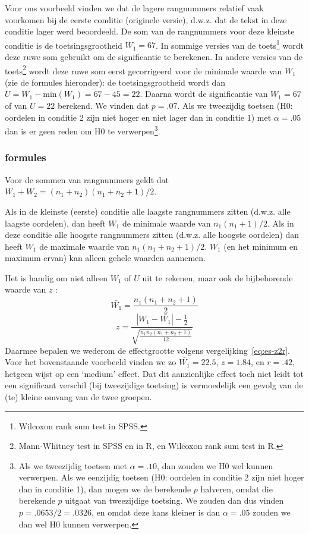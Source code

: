 \documentclass[
]{book}
\begin{document}
Voor ons voorbeeld vinden we dat de lagere rangnummers relatief vaak
voorkomen bij de eerste conditie (originele versie), d.w.z. dat de tekst
in deze conditie lager werd beoordeeld. De som van de rangnummers voor
deze kleinste conditie is de toetsingsgrootheid \(W_1=67\). In sommige
versies van de toets\footnote{Wilcoxon rank sum test in SPSS.} wordt deze ruwe som gebruikt om de
significantie te berekenen. In andere versies van de toets\footnote{Mann-Whitney test in SPSS en in R, en Wilcoxon rank sum test in R.} wordt
deze ruwe som eerst gecorrigeerd voor de minimale waarde van \(W_1\) (zie
de formules hieronder): de toetsingsgrootheid wordt dan
\(U=W_1 - \textrm{min}(W_1) = 67-45=22\). Daarna wordt de significantie
van \(W_1=67\) of van \(U=22\) berekend. We vinden dat \(p=.07\). Als we
tweezijdig toetsen (H0: oordelen in conditie 2 zijn niet hoger en niet
lager dan in conditie 1) met \(\alpha=.05\) dan is er geen reden om H0 te
verwerpen\footnote{Als we tweezijdig toetsen met \(\alpha=.10\), dan zouden we H0 wel kunnen verwerpen. Als we eenzijdig toetsen (H0: oordelen in conditie 2 zijn niet hoger dan in conditie 1), dan mogen we de berekende \(p\) halveren, omdat die berekende \(p\) uitgaat van tweezijdige toetsing. We zouden dan dus vinden \(p=.0653/2=.0326\), en omdat deze kans kleiner is dan \(\alpha=.05\) zouden we dan wel H0 kunnen verwerpen.}.

\subsubsection{formules}\label{formules-8}

Voor de sommen van rangnummers geldt dat
\(W_1 + W_2 = (n_1+n_2) (n_1+n_2+1) / 2\).

Als in de kleinste (eerste) conditie alle laagste rangnummers zitten
(d.w.z. alle laagste oordelen), dan heeft \(W_1\) de minimale waarde van
\(n_1 (n_1+1) /2\). Als in deze conditie alle hoogste rangnummers zitten
(d.w.z. alle hoogste oordelen) dan heeft \(W_1\) de maximale waarde van
\(n_1 (n_1+n_2+1) / 2\). \(W_1\) (en het minimum en maximum ervan) kan
alleen gehele waarden aannemen.

Het is handig om niet alleen \(W_1\) of \(U\) uit te rekenen, maar ook de
bijbehorende waarde van \(z\) \citep{Ferg89}:
\begin{equation}
  \label{eq:Wilcoxon-ranksum}
\bar{W_1} = \frac{ n_1 (n_1+n_2+1) }{ 2 }
\end{equation}
\begin{equation}
   \label{eq:Wilcoxon-ranksum-z}
  z = \frac{ |W_1-\bar{W_1}|-\frac{1}{2} }{ \sqrt{ \frac{n_1 n_2 (n_1+n_2+1)}{12} } }
\end{equation}
Daarmee bepalen we wederom de effectgrootte volgens
vergelijking~\eqref{eq:es-z2r}.
Voor het bovenstaande voorbeeld vinden we zo
\(\bar{W_1}=22.5\), \(z=1.84\), en \(r=.42\), hetgeen wijst op een `medium'
effect. Dat dit aanzienlijke effect toch niet leidt tot een significant
verschil (bij tweezijdige toetsing) is vermoedelijk een gevolg van de
(te) kleine omvang van de twee groepen.
\end{document}

